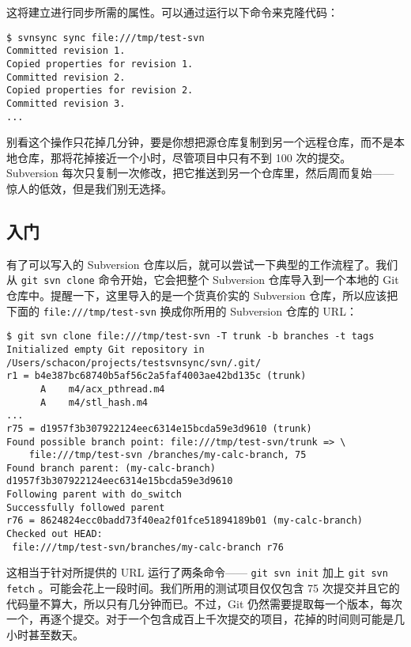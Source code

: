 \documentclass[a4paper]{book}
\begin{document}
这将建立进行同步所需的属性。可以通过运行以下命令来克隆代码：

\begin{shaded}\begin{verbatim}
$ svnsync sync file:///tmp/test-svn
Committed revision 1.
Copied properties for revision 1.
Committed revision 2.
Copied properties for revision 2.
Committed revision 3.
...
\end{verbatim}\end{shaded}

别看这个操作只花掉几分钟，要是你想把源仓库复制到另一个远程仓库，而不是本地仓库，那将花掉接近一个小时，尽管项目中只有不到 100 次的提交。 Subversion 每次只复制一次修改，把它推送到另一个仓库里，然后周而复始------惊人的低效，但是我们别无选择。

\subsection{入门}

有了可以写入的 Subversion 仓库以后，就可以尝试一下典型的工作流程了。我们从 \texttt{git svn clone} 命令开始，它会把整个 Subversion 仓库导入到一个本地的 Git 仓库中。提醒一下，这里导入的是一个货真价实的 Subversion 仓库，所以应该把下面的 \texttt{file:///tmp/test-svn} 换成你所用的 Subversion 仓库的 URL：

\begin{shaded}\begin{verbatim}
$ git svn clone file:///tmp/test-svn -T trunk -b branches -t tags
Initialized empty Git repository in /Users/schacon/projects/testsvnsync/svn/.git/
r1 = b4e387bc68740b5af56c2a5faf4003ae42bd135c (trunk)
      A    m4/acx_pthread.m4
      A    m4/stl_hash.m4
...
r75 = d1957f3b307922124eec6314e15bcda59e3d9610 (trunk)
Found possible branch point: file:///tmp/test-svn/trunk => \
    file:///tmp/test-svn /branches/my-calc-branch, 75
Found branch parent: (my-calc-branch) d1957f3b307922124eec6314e15bcda59e3d9610
Following parent with do_switch
Successfully followed parent
r76 = 8624824ecc0badd73f40ea2f01fce51894189b01 (my-calc-branch)
Checked out HEAD:
 file:///tmp/test-svn/branches/my-calc-branch r76
\end{verbatim}\end{shaded}

这相当于针对所提供的 URL 运行了两条命令------ \texttt{git svn init} 加上 \texttt{git svn fetch} 。可能会花上一段时间。我们所用的测试项目仅仅包含 75 次提交并且它的代码量不算大，所以只有几分钟而已。不过，Git 仍然需要提取每一个版本，每次一个，再逐个提交。对于一个包含成百上千次提交的项目，花掉的时间则可能是几小时甚至数天。
\end{document}
